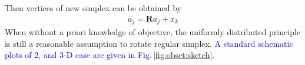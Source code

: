\documentclass[final,1p,times]{elsarticle}
\begin{document}
Then vertices of new simplex can be obtained by
\begin{align}
	a_j = \bm{R}a_j + x_k
	\label{}
\end{align}
When without a priori knowledge of objective, the uniformly
distributed principle is still a reasonable assumption to rotate regular simplex.
\textcolor{blue}{
A standard schematic plots of $2$, and
$3$-D case are given in Fig.\,\ref{fig:obset:sketch}.
}
\end{document}

